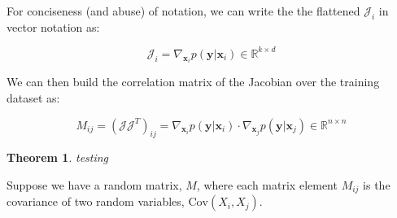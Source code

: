 \documentclass{article}
\newtheorem{theorem}{Theorem}
\newcommand{\R}{\mathbb{R}}
\newcommand{\Cov}{\mathrm{Cov}}
\newcommand{\matr}[1]{\mathbf{#1}}
\begin{document}
For conciseness (and abuse) of notation, we can write the the flattened $\mathcal{J}_i$ in vector notation as:

\begin{equation}
\mathcal{J}_i = \nabla_{\matr{x}_i} p(\matr{y} | \matr{x}_i) \in \R^{k \times d}
\end{equation}

We can then build the correlation matrix of the Jacobian over the training dataset as:

\begin{equation}
M_{ij} = (\mathcal{J} \mathcal{J}^T)_{ij} = \nabla_{\matr{x}_i} p(\matr{y}|\matr{x}_i) \cdot \nabla_{\matr{x}_j} p(\matr{y}|\matr{x}_j) \in \R^{n \times n} 
\end{equation}

\begin{theorem}
testing
\end{theorem}

Suppose we have a random matrix, $M$, where each matrix element $M_{ij}$ is the covariance of two random variables, $\Cov(X_i, X_j)$. 




\end{document}
